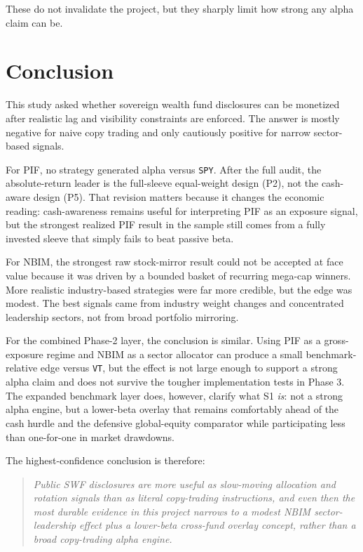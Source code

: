 \documentclass[conference]{IEEEtran}
\begin{document}
These do not invalidate the project, but they sharply limit how strong any alpha claim can be.

\section{Conclusion}

This study asked whether sovereign wealth fund disclosures can be monetized after realistic lag and visibility constraints are enforced. The answer is mostly negative for naive copy trading and only cautiously positive for narrow sector-based signals.

For PIF, no strategy generated alpha versus \texttt{SPY}. After the full audit, the absolute-return leader is the full-sleeve equal-weight design (P2), not the cash-aware design (P5). That revision matters because it changes the economic reading: cash-awareness remains useful for interpreting PIF as an exposure signal, but the strongest realized PIF result in the sample still comes from a fully invested sleeve that simply fails to beat passive beta.

For NBIM, the strongest raw stock-mirror result could not be accepted at face value because it was driven by a bounded basket of recurring mega-cap winners. More realistic industry-based strategies were far more credible, but the edge was modest. The best signals came from industry weight changes and concentrated leadership sectors, not from broad portfolio mirroring.

For the combined Phase-2 layer, the conclusion is similar. Using PIF as a gross-exposure regime and NBIM as a sector allocator can produce a small benchmark-relative edge versus \texttt{VT}, but the effect is not large enough to support a strong alpha claim and does not survive the tougher implementation tests in Phase 3. The expanded benchmark layer does, however, clarify what S1 \emph{is}: not a strong alpha engine, but a lower-beta overlay that remains comfortably ahead of the cash hurdle and the defensive global-equity comparator while participating less than one-for-one in market drawdowns.

The highest-confidence conclusion is therefore:
\begin{quote}
\textit{Public SWF disclosures are more useful as slow-moving allocation and rotation signals than as literal copy-trading instructions, and even then the most durable evidence in this project narrows to a modest NBIM sector-leadership effect plus a lower-beta cross-fund overlay concept, rather than a broad copy-trading alpha engine.}
\end{quote}
\end{document}
